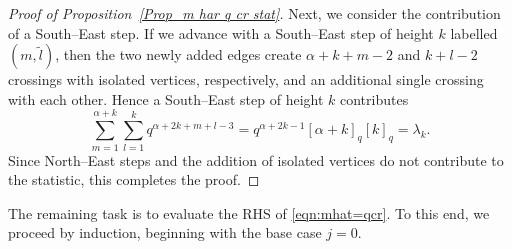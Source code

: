 \documentclass{amsart}
\theoremstyle{plain}
\theoremstyle{remark}
\numberwithin{equation}{section}
\begin{document}
\begin{proof}[Proof of Proposition~\ref{Prop_m har q cr stat}]
Next, we consider the contribution of a South–East step.  If we advance with a South–East step of height $k$ labelled $(m,\widetilde{l})$, then the two newly added edges create  $\alpha + k + m - 2$ and $k + l - 2$ crossings with isolated vertices, respectively, and an additional single crossing with each other.  Hence a South–East step of height $k$ contributes
    \begin{equation*}
        \sum_{m=1}^{\alpha+k}\sum_{l=1}^{k}q^{\alpha+2k+m+l-3}=q^{\alpha+2k-1}[\alpha+k]_{q}[k]_{q}=\lambda_{k}.
    \end{equation*}
Since North–East steps and the addition of isolated vertices do not contribute to the statistic, this completes the proof.
\end{proof}






The remaining task is to evaluate the RHS of \eqref{eqn:mhat=qcr}.  
To this end, we proceed by induction, beginning with the base case $j = 0$.
\end{document}
